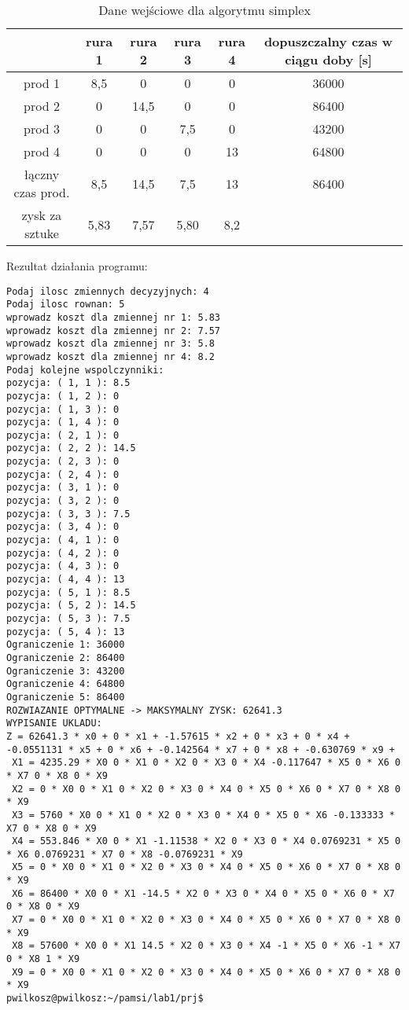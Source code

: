 \documentclass[a4paper,11pt]{article}
\begin{document}
\begin{table}[h]
\centering
\caption{Dane wejściowe dla algorytmu simplex}
\begin{tabular}{|c|c|c|c|c|c|}
 \hline
  & rura 1 & rura 2 & rura 3 & rura 4 & dopuszczalny czas w ciągu doby [s] \\
  \hline
  prod 1 & 8,5 & 0 & 0 & 0 & 36000\\
  \hline
  prod 2 & 0 & 14,5 & 0 & 0 & 86400\\
  \hline
  prod 3  & 0 & 0 & 7,5 & 0 & 43200 \\
  \hline 
  prod 4  & 0 & 0 & 0 & 13 & 64800\\
  \hline 
  łączny czas prod.  & 8,5 & 14,5 & 7,5 & 13 & 86400\\
  \hline 
  zysk za sztuke & 5,83 & 7,57 & 5,80 & 8,2 & \\
  \hline
  \end{tabular}
\label{tab2}
\end{table}
\newpage
Rezultat działania programu:
\tiny
\begin{verbatim}
Podaj ilosc zmiennych decyzyjnych: 4
Podaj ilosc rownan: 5
wprowadz koszt dla zmiennej nr 1: 5.83
wprowadz koszt dla zmiennej nr 2: 7.57
wprowadz koszt dla zmiennej nr 3: 5.8
wprowadz koszt dla zmiennej nr 4: 8.2
Podaj kolejne wspolczynniki: 
pozycja: ( 1, 1 ): 8.5
pozycja: ( 1, 2 ): 0
pozycja: ( 1, 3 ): 0
pozycja: ( 1, 4 ): 0
pozycja: ( 2, 1 ): 0
pozycja: ( 2, 2 ): 14.5
pozycja: ( 2, 3 ): 0
pozycja: ( 2, 4 ): 0
pozycja: ( 3, 1 ): 0
pozycja: ( 3, 2 ): 0
pozycja: ( 3, 3 ): 7.5
pozycja: ( 3, 4 ): 0
pozycja: ( 4, 1 ): 0
pozycja: ( 4, 2 ): 0
pozycja: ( 4, 3 ): 0
pozycja: ( 4, 4 ): 13
pozycja: ( 5, 1 ): 8.5
pozycja: ( 5, 2 ): 14.5
pozycja: ( 5, 3 ): 7.5
pozycja: ( 5, 4 ): 13
Ograniczenie 1: 36000
Ograniczenie 2: 86400
Ograniczenie 3: 43200
Ograniczenie 4: 64800
Ograniczenie 5: 86400
ROZWIAZANIE OPTYMALNE -> MAKSYMALNY ZYSK: 62641.3
WYPISANIE UKLADU: 
Z = 62641.3 * x0 + 0 * x1 + -1.57615 * x2 + 0 * x3 + 0 * x4 + -0.0551131 * x5 + 0 * x6 + -0.142564 * x7 + 0 * x8 + -0.630769 * x9 + 
 X1 = 4235.29 * X0 0 * X1 0 * X2 0 * X3 0 * X4 -0.117647 * X5 0 * X6 0 * X7 0 * X8 0 * X9 
 X2 = 0 * X0 0 * X1 0 * X2 0 * X3 0 * X4 0 * X5 0 * X6 0 * X7 0 * X8 0 * X9 
 X3 = 5760 * X0 0 * X1 0 * X2 0 * X3 0 * X4 0 * X5 0 * X6 -0.133333 * X7 0 * X8 0 * X9 
 X4 = 553.846 * X0 0 * X1 -1.11538 * X2 0 * X3 0 * X4 0.0769231 * X5 0 * X6 0.0769231 * X7 0 * X8 -0.0769231 * X9 
 X5 = 0 * X0 0 * X1 0 * X2 0 * X3 0 * X4 0 * X5 0 * X6 0 * X7 0 * X8 0 * X9 
 X6 = 86400 * X0 0 * X1 -14.5 * X2 0 * X3 0 * X4 0 * X5 0 * X6 0 * X7 0 * X8 0 * X9 
 X7 = 0 * X0 0 * X1 0 * X2 0 * X3 0 * X4 0 * X5 0 * X6 0 * X7 0 * X8 0 * X9 
 X8 = 57600 * X0 0 * X1 14.5 * X2 0 * X3 0 * X4 -1 * X5 0 * X6 -1 * X7 0 * X8 1 * X9 
 X9 = 0 * X0 0 * X1 0 * X2 0 * X3 0 * X4 0 * X5 0 * X6 0 * X7 0 * X8 0 * X9 
pwilkosz@pwilkosz:~/pamsi/lab1/prj$ 


\end{verbatim}
\normalsize
\end{document}
